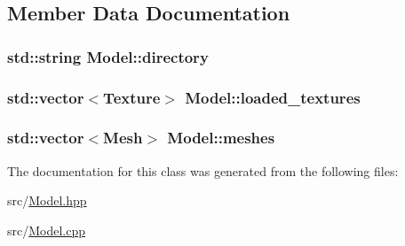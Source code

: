 \subsection{Member Data Documentation}
\subsubsection[{\texorpdfstring{directory}{directory}}]{\setlength{\rightskip}{0pt plus 5cm}std\+::string Model\+::directory\hspace{0.3cm}{\ttfamily [private]}}\hypertarget{classModel_a5ea3aa111c7a7d179e93dcc0bb567701}{}\label{classModel_a5ea3aa111c7a7d179e93dcc0bb567701}
\subsubsection[{\texorpdfstring{loaded\+\_\+textures}{loaded_textures}}]{\setlength{\rightskip}{0pt plus 5cm}std\+::vector$<${\bf Texture}$>$ Model\+::loaded\+\_\+textures\hspace{0.3cm}{\ttfamily [private]}}\hypertarget{classModel_a6b63a4363bd6bd2e977b0c022ee7e772}{}\label{classModel_a6b63a4363bd6bd2e977b0c022ee7e772}
\subsubsection[{\texorpdfstring{meshes}{meshes}}]{\setlength{\rightskip}{0pt plus 5cm}std\+::vector$<${\bf Mesh}$>$ Model\+::meshes\hspace{0.3cm}{\ttfamily [private]}}\hypertarget{classModel_a538e42901dcfba59471072a48a162163}{}\label{classModel_a538e42901dcfba59471072a48a162163}


The documentation for this class was generated from the following files\+:\begin{DoxyCompactItemize}
\item 
src/\hyperlink{Model_8hpp}{Model.\+hpp}\item 
src/\hyperlink{Model_8cpp}{Model.\+cpp}\end{DoxyCompactItemize}
